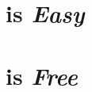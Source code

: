 \documentclass[letterpaper]{article}
\begin{document}
%        
%
%
%
%



    

    \section*{\LaTeXe{} is \textit{Easy}}

    

    \section*{\LaTeXe{} is \textit{Free}}
\end{document}
